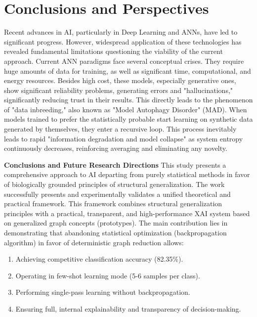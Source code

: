 \documentclass[conference]{IEEEtran}
\begin{document}
\section{Conclusions and Perspectives}
Recent advances in AI, particularly in Deep Learning and ANNs, have led to significant progress. However, widespread application of these technologies has revealed fundamental limitations questioning the viability of the current approach. Current ANN paradigms face several conceptual crises. They require huge amounts of data for training, as well as significant time, computational, and energy resources. Besides high cost, these models, especially generative ones, show significant reliability problems, generating errors and "hallucinations," significantly reducing trust in their results. This directly leads to the phenomenon of "data inbreeding," also known as "Model Autophagy Disorder" (MAD). When models trained to prefer the statistically probable start learning on synthetic data generated by themselves, they enter a recursive loop. This process inevitably leads to rapid "information degradation and model collapse" as system entropy continuously decreases, reinforcing averaging and eliminating any novelty.

\textbf{Conclusions and Future Research Directions}
This study presents a comprehensive approach to AI departing from purely statistical methods in favor of biologically grounded principles of structural generalization. The work successfully presents and experimentally validates a unified theoretical and practical framework. This framework combines structural generalization principles with a practical, transparent, and high-performance XAI system based on generalized graph concepts (prototypes).
The main contribution lies in demonstrating that abandoning statistical optimization (backpropagation algorithm) in favor of deterministic graph reduction allows:
\begin{enumerate}
    \item Achieving competitive classification accuracy (82.35\%).
    \item Operating in few-shot learning mode (5-6 samples per class).
    \item Performing single-pass learning without backpropagation.
    \item Ensuring full, internal explainability and transparency of decision-making.
\end{enumerate}
\end{document}
